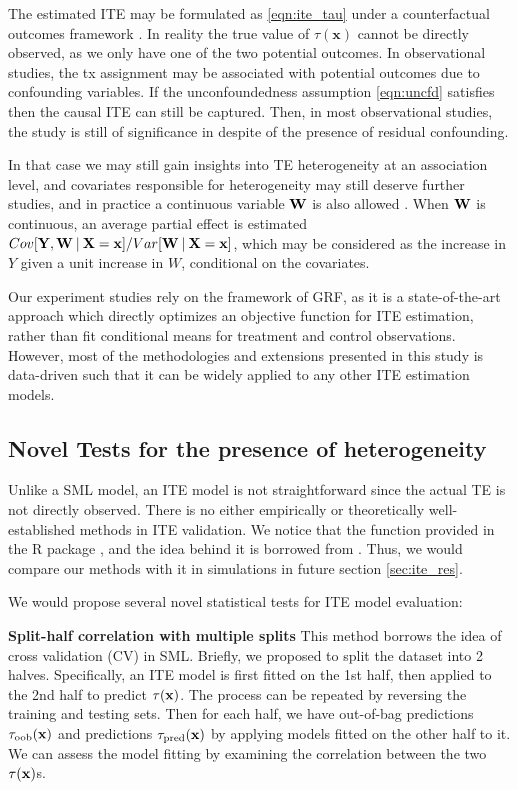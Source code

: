   The estimated ITE may be formulated as \ref{eqn:ite_tau} under a counterfactual outcomes framework \cite{rubin2005causal}. In reality the true value of $\tau(\mathbf{x})$ cannot be directly observed, as we only have one of the two potential outcomes. In observational studies, the tx assignment may be associated with potential outcomes due to confounding variables. If the unconfoundedness assumption \ref{eqn:uncfd} satisfies then the causal ITE can still be captured. Then, in most observational studies, the study is still of significance in despite of the presence of residual confounding. 
  
  In that case we may still gain insights into TE heterogeneity at an association level, and covariates responsible for heterogeneity may still deserve further studies, and in practice a continuous variable $\mathbf{W}$ is also allowed \cite{athey2019generalized}. When $\mathbf{W}$ is continuous, an average partial effect is estimated $Cov [\mathbf{Y},\mathbf{W} \:\vert\: \mathbf{X} = \mathbf{x}] / Var[\mathbf{W} \:\vert\: \mathbf{X} = \mathbf{x}]$, which may be considered as the increase in $Y$ given a unit increase in $W$, conditional on the covariates. 
  
  Our experiment studies rely on the framework of GRF, as it is a state-of-the-art approach which directly optimizes an objective function for ITE estimation, rather than fit conditional means for treatment and control observations. However, most of the methodologies and extensions presented in this study is data-driven such that it can be widely applied to any other ITE estimation models.

  \subsection{Novel Tests for the presence of heterogeneity}
  \label{sec:ite_novel_tests}
    Unlike a SML model, an ITE model is not straightforward since the actual TE is not directly observed. There is no either empirically or theoretically well-established methods in ITE validation. 
    We notice that the function  provided in the R package  \cite{tibshirani2018package}, and the idea behind it is borrowed from \cite{chernozhukov2018generic}. Thus,  we would compare our methods with it in simulations in future section \ref{sec:ite_res}.
    
    We would propose several novel statistical tests for ITE model evaluation:

    \textbf{Split-half correlation with multiple splits}  This method borrows the idea of cross validation (CV) in SML. Briefly, we proposed to split the dataset into 2 halves. Specifically, an ITE model is first fitted on the 1st half, then applied to the 2nd half to predict $\tau(\mathbf{x})$. The process can be repeated by reversing the training and testing sets. Then for each half, we have out-of-bag predictions $\tau_\mathrm{oob}(\mathbf{x})$ and predictions $\tau_\mathrm{pred}(\mathbf{x})$ by applying models fitted on the other half to it. We can assess the model fitting by examining the correlation between the two $\tau(\mathbf{x})$s.

